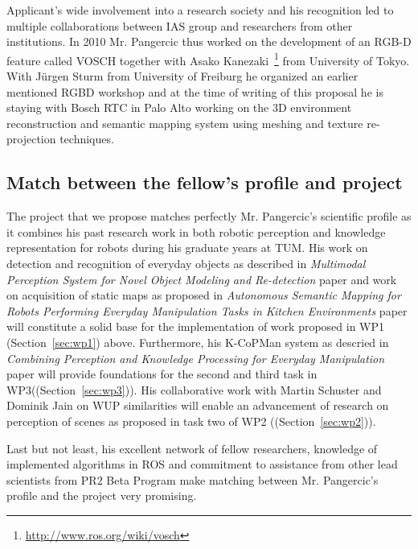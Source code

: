 Applicant's wide involvement into a research society and his recognition led to multiple collaborations
between IAS group and researchers from other institutions. In 2010 Mr. Pangercic
thus worked on the development of an RGB-D feature called VOSCH together with
Asako Kanezaki~\footnote{\url{http://www.ros.org/wiki/vosch}} from University of Tokyo.
With J\"urgen Sturm from University of Freiburg he organized an earlier mentioned
RGBD workshop and at the time of writing of this proposal he is staying with Bosch RTC
in Palo Alto working on the 3D environment reconstruction and semantic mapping system using meshing and texture re-projection
techniques.
\subsection{Match between the fellow's profile and project}
The project that we propose matches perfectly Mr. Pangercic's scientific profile as it combines
his past research work in both robotic perception and knowledge representation for robots
during his graduate years at TUM. His work on detection and recognition of everyday objects as
described in \emph{Multimodal Perception System for Novel Object Modeling and Re-detection} paper
and work on acquisition of static maps as proposed in \emph{Autonomous Semantic Mapping for Robots Performing  
Everyday Manipulation Tasks in Kitchen Environments} paper will constitute a solid base for the
implementation of work proposed in WP1 (Section~\ref{sec:wp1}) above. Furthermore, his K-CoPMan system as descried in
\emph{Combining Perception and Knowledge Processing for Everyday Manipulation} paper will
provide foundations for the second and third task in WP3((Section~\ref{sec:wp3})). His collaborative work with Martin Schuster
and Dominik Jain on WUP similarities will enable an advancement of research on perception
of scenes as proposed in task two of WP2 ((Section~\ref{sec:wp2})).

Last but not least, his excellent network of fellow researchers, knowledge of implemented algorithms
in ROS and commitment to assistance from other lead scientists from PR2 Beta Program make
matching between Mr. Pangercic's profile and the project very promising.

